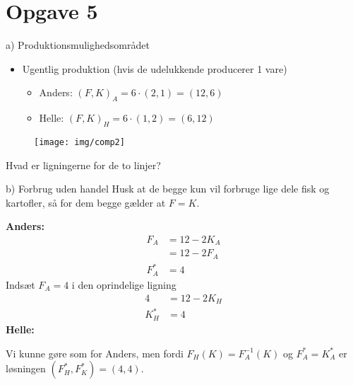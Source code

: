 \section{Opgave 5}

\begin{frame}{a) Produktionsmulighedsområdet}
\begin{itemize}
  \item Ugentlig produktion (hvis de udelukkende producerer 1 vare)
  \begin{itemize}
    \item Anders: $(F,K)_A = 6\cdot (2,1) = (12,6)$
    \item Helle: $(F,K)_H = 6 \cdot (1,2) = (6, 12)$
  \end{itemize}
\end{itemize}
\begin{figure}
\centering
    \texttt{[image: img/comp2]}
\end{figure}
Hvad er ligningerne for de to linjer?
\end{frame}


\begin{frame}{b) Forbrug uden handel}
Husk at de begge kun vil forbruge lige dele fisk og kartofler, så for dem begge gælder at $F=K$.

\textbf{Anders:}
\begin{align*}
  F_A &= 12-2K_A \\
  & = 12 - 2F_A \\
  F^*_A &= 4
\end{align*}
Indsæt $F_A = 4$ i den oprindelige ligning
\begin{align*}
  4 &= 12 -2K_H \\
  K^*_H &= 4
\end{align*}
\textbf{Helle:}

Vi kunne gøre som for Anders, men fordi $F_H(K) = F_A^{-1}(K)$ og $F_A^*=K_A^*$ er løsningen $(F_H^*, F_K^*) = (4,4)$.
\end{frame}


